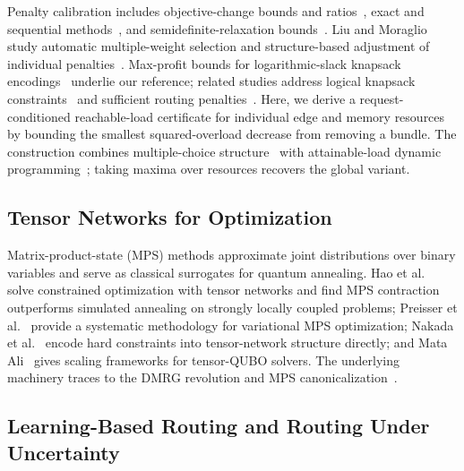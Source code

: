 \documentclass[twocolumn]{article}
\begin{document}
Penalty calibration includes objective-change bounds and ratios~\cite{verma2022penalty,ayodele2022penalty}, exact and sequential methods~\cite{garcia2022exact}, and semidefinite-relaxation bounds~\cite{alessandroni2025bigm}. Liu and Moraglio study automatic multiple-weight selection and structure-based adjustment of individual penalties~\cite{liu2025multiple,liu2026structure}. Max-profit bounds for logarithmic-slack knapsack encodings~\cite{quintero2021knapsack,guney2025multiknapsack} underlie our reference; related studies address logical knapsack constraints~\cite{guney2026logical} and sufficient routing penalties~\cite{seker2024routing}.
Here, we derive a request-conditioned reachable-load certificate for individual edge and memory resources by bounding the smallest squared-overload decrease from removing a bundle. The construction combines multiple-choice structure~\cite{sinha1979multiple} with attainable-load dynamic programming~\cite{trick2003dynamic}; taking maxima over resources recovers the global variant.

\subsection{Tensor Networks for Optimization}
\label{sec:related-tn}

Matrix-product-state (MPS) methods approximate joint distributions
over binary variables and serve as classical surrogates for quantum
annealing.  Hao et al.~\cite{hao2022quantum} solve constrained
optimization with tensor networks and find MPS contraction outperforms
simulated annealing on strongly locally coupled problems;
Preisser et al.~\cite{preisser2026variational} provide a systematic
methodology for variational MPS optimization; Nakada et
al.~\cite{nakada2025quick} encode hard constraints into tensor-network
structure directly; and Mata Ali~\cite{mata2025explicit,
mata2023polynomial} gives scaling frameworks for tensor-QUBO solvers.
The underlying machinery traces to the DMRG revolution and MPS
canonicalization~\cite{white1992dmrg,schollwock2011dmrg,
vidal2003efficient,orus2014practical,orus2019tensor}.

\subsection{Learning-Based Routing and Routing Under Uncertainty}
\label{sec:related-learning}
\end{document}
